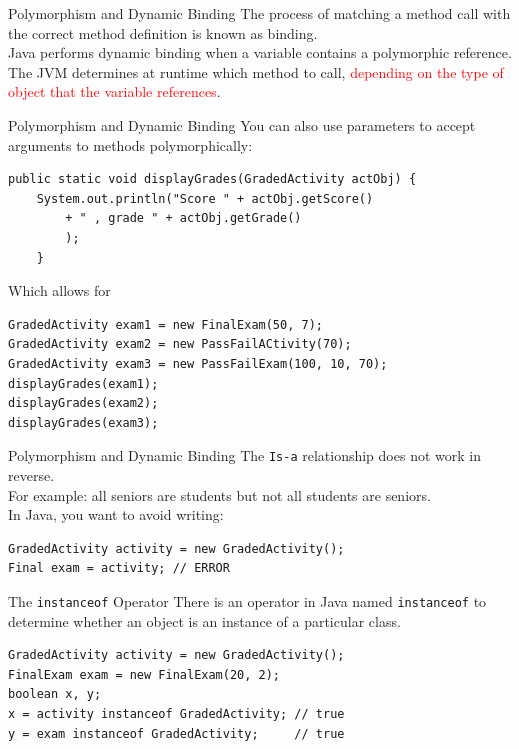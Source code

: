 \documentclass[11pt]{beamer}
\newcommand{\red}[1]{\textcolor{red}{#1}}
\begin{document}
\begin{frame}{Polymorphism and Dynamic Binding}
    The process of matching a method call with the correct method definition is known as binding. \\ \vspace{1em} 
    Java performs dynamic binding when a variable contains a polymorphic reference. \\ \vspace{1em} 
    The JVM determines at runtime which method to call, \red{depending on the type of object that the variable references}.
\end{frame}

\begin{frame}[fragile]{Polymorphism and Dynamic Binding}
    You can also use parameters to accept arguments to methods polymorphically:
    \begin{lstlisting}
public static void displayGrades(GradedActivity actObj) {
    System.out.println("Score " + actObj.getScore()
        + " , grade " + actObj.getGrade()
        );
    }
    \end{lstlisting}
    Which allows for
    \begin{lstlisting}
GradedActivity exam1 = new FinalExam(50, 7);
GradedActivity exam2 = new PassFailACtivity(70);
GradedActivity exam3 = new PassFailExam(100, 10, 70);
displayGrades(exam1);
displayGrades(exam2);
displayGrades(exam3);
    \end{lstlisting}
\end{frame}

\begin{frame}[fragile]{Polymorphism and Dynamic Binding}
    The \texttt{Is-a} relationship does not work in reverse. \\ \vspace{1em}
    For example: all seniors are students but not all students are seniors. \\ \vspace{1em}
    In Java, you want to avoid writing:
    \begin{lstlisting}
GradedActivity activity = new GradedActivity();
Final exam = activity; // ERROR
    \end{lstlisting}
\end{frame}

\begin{frame}[fragile]{The \texttt{instanceof} Operator}
    There is an operator in Java named \texttt{instanceof} to determine whether an object is an instance of a particular class.
    \begin{lstlisting}
GradedActivity activity = new GradedActivity();
FinalExam exam = new FinalExam(20, 2);
boolean x, y;
x = activity instanceof GradedActivity; // true
y = exam instanceof GradedActivity;     // true
    \end{lstlisting}
\end{frame}
\end{document}
